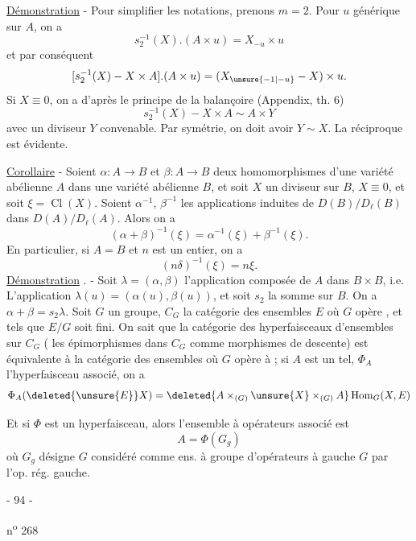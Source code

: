 \uline{Démonstration} - Pour simplifier les notations, prenons $m=2$. Pour $u$ générique sur $A$, on a
\[
s_2^{-1}(X).(A\times u)=X_{-u}\times u
\]
et par conséquent
\[
[s_2^{-1}(X)-X\times A].(A\times u)=(X_{\unsure{-1|-u}}-X)\times u.
\]
Si $X\equiv0$, on a d'après le principe de la balançoire (Appendix, th. 6)
\[
s_2^{-1}(X)-X\times A\sim A\times Y
\]
avec un diviseur $Y$ convenable. Par symétrie, on doit avoir $Y\sim X$. La réciproque est évidente.

\uline{Corollaire} - Soient $\alpha:A\longrightarrow B$ et $\beta:A\longrightarrow B$ deux homomorphismes d'une variété abélienne $A$ dans une variété abélienne $B$, et soit $X$ un diviseur sur $B$, $X\equiv0$, et soit $\xi=\operatorname{Cl}(X)$. Soient $\alpha^{-1}$, $\beta^{-1}$ les applications induites de $D(B)/D_\ell(B)$ dans $D(A)/D_\ell(A)$. Alors on a
\[
(\alpha+\beta)^{-1}(\xi)=\alpha^{-1}(\xi)+\beta^{-1}(\xi).
\]
En particulier, si $A=B$ et $n$ est un entier, on a
\[
(n\delta)^{-1}(\xi)=n\xi.
\]
\uline{Démonstration} . - Soit $\lambda=(\alpha,\beta)$ l'application composée de $A$ dans $B\times B$, i.e. L'application $\lambda(u)=(\alpha(u),\beta(u))$, et soit $s_2$ la somme sur $B$. On a $\alpha+\beta=s_2\lambda$.
Soit $G$ un groupe, $C_G$ la catégorie des ensembles $E$ où $G$ opère , et tels que $E/G$ soit fini. On sait que la catégorie des hyperfaisceaux d'ensembles sur $C_G$ ( les épimorphismes dans $C_G$ comme morphismes de descente) est équivalente à la catégorie des ensembles  où $G$ opère à   ; si $A$ est un tel, $\Phi_A$ l'hyperfaisceau associé, on a
\[
\Phi_A(\deleted{\unsure{E}}X)=\deleted{A\times_{(G)}\unsure{X}\times_{(G)}A}\operatorname{Hom}_G(X,E)
\]

Et si $\Phi$ est un hyperfaisceau, alors l'ensemble à opérateurs associé est
\[
A=\Phi(G_g)
\]
où $G_g$ désigne $G$ considéré comme ens. à groupe d'opérateurs à gauche $G$ par l'op. rég. gauche.

\begin{center}- 94 -\end{center}\hfill n\textsuperscript{o} 268

